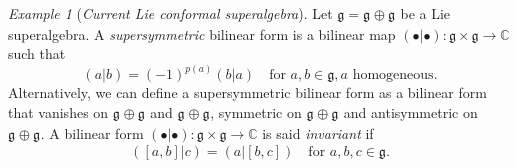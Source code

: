 \documentclass[a4paper, 12pt, reqno]{amsart}
\theoremstyle{remark}
\newtheorem{example}[theorem]{Example}
\numberwithin{equation}{subsection}
\DeclareMathOperator{\zero}{\overline{0}}
\DeclareMathOperator{\one}{\overline{1}}
\begin{document}
\begin{example}[\emph{Current Lie conformal superalgebra}]
  \label{exa:2}
  Let $\mathfrak{g} = \mathfrak{g}_{\zero} \oplus \mathfrak{g}_{\one}$ be a Lie superalgebra.
  A \emph{supersymmetric} bilinear form is a bilinear map $(\bullet| \bullet): \mathfrak{g} \times \mathfrak{g} \to \mathbb{C}$ such that
  \begin{equation*}
    (a| b) = (-1)^{p(a)}(b| a) \quad \text{for }a, b \in \mathfrak{g}, a\text{ homogeneous}.
  \end{equation*}
  Alternatively, we can define a supersymmetric bilinear form as a bilinear form that vanishes on $\mathfrak{g}_{\zero} \oplus \mathfrak{g}_{\one}$ and $\mathfrak{g}_{\one} \oplus \mathfrak{g}_{\zero}$, symmetric on $\mathfrak{g}_{\zero} \oplus \mathfrak{g}_{\zero}$ and antisymmetric on $\mathfrak{g}_{\one} \oplus \mathfrak{g}_{\one}$.
  A bilinear form $(\bullet| \bullet): \mathfrak{g} \times \mathfrak{g} \to \mathbb{C}$ is said \emph{invariant} if
  \begin{equation*}
    ([a, b]| c) = (a| [b, c]) \quad \text{for }a, b, c \in \mathfrak{g}.
  \end{equation*}


\end{example}
\end{document}
